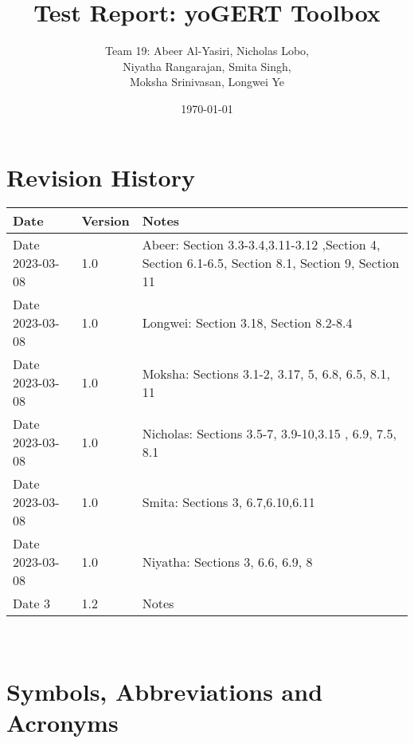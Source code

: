 \documentclass[12pt, titlepage]{article}
\begin{document}
\title{Test Report: yoGERT Toolbox} 

\author{Team 19: Abeer Al-Yasiri, Nicholas Lobo,\\ Niyatha Rangarajan, Smita Singh,\\ Moksha Srinivasan, Longwei Ye}
\date{\today}
	
\maketitle


\section{Revision History}

\begin{tabularx}{\textwidth}{p{3cm}p{2cm}X}
\toprule {\bf Date} & {\bf Version} & {\bf Notes}\\
\midrule
Date 2023-03-08 & 1.0 & Abeer: Section 3.3-3.4,3.11-3.12 ,Section 4, Section 6.1-6.5, Section 8.1, Section 9, Section 11 \\
Date 2023-03-08 & 1.0 & Longwei: Section 3.18, Section 8.2-8.4\\
Date 2023-03-08 & 1.0 & Moksha: Sections 3.1-2, 3.17, 5, 6.8, 6.5, 8.1, 11\\
Date 2023-03-08 & 1.0 & Nicholas: Sections 3.5-7, 3.9-10,3.15 , 6.9, 7.5, 8.1\\
Date 2023-03-08 & 1.0 & Smita: Sections 3, 6.7,6.10,6.11\\
Date 2023-03-08 & 1.0 & Niyatha: Sections 3, 6.6, 6.9, 8 \\
Date 3 & 1.2 & Notes\\
\bottomrule
\end{tabularx}

~\newpage

\section{Symbols, Abbreviations and Acronyms}

\end{document}
